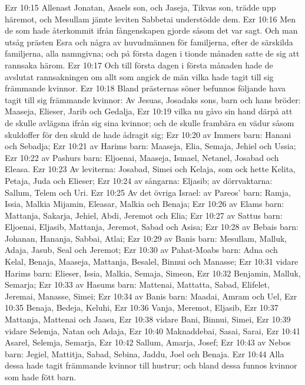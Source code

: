 Ezr 10:15  Allenast Jonatan, Asaels son, och Jaseja, Tikvas son, trädde upp häremot, och Mesullam jämte leviten Sabbetai understödde dem.
Ezr 10:16  Men de som hade återkommit ifrån fångenskapen gjorde såsom det var sagt. Och man utsåg prästen Esra och några av huvudmännen för familjerna, efter de särskilda familjerna, alla namngivna; och på första dagen i tionde månaden satte de sig att rannsaka härom.
Ezr 10:17  Och till första dagen i första månaden hade de avslutat rannsakningen om allt som angick de män vilka hade tagit till sig främmande kvinnor.
Ezr 10:18  Bland prästernas söner befunnos följande hava tagit till sig främmande kvinnor: Av Jesuas, Josadaks sons, barn och hans bröder: Maaseja, Elieser, Jarib och Gedalja,
Ezr 10:19  vilka nu gåvo sin hand därpå att de skulle avlägsna ifrån sig sina kvinnor; och de skulle frambära en vädur såsom skuldoffer för den skuld de hade ådragit sig;
Ezr 10:20  av Immers barn: Hanani och Sebadja;
Ezr 10:21  av Harims barn: Maaseja, Elia, Semaja, Jehiel och Ussia;
Ezr 10:22  av Pashurs barn: Eljoenai, Maaseja, Ismael, Netanel, Josabad och Eleasa.
Ezr 10:23  Av leviterna: Josabad, Simei och Kelaja, som ock hette Kelita, Petaja, Juda och Elieser;
Ezr 10:24  av sångarna: Eljasib; av dörrvaktarna: Sallum, Telem och Uri.
Ezr 10:25  Av det övriga Israel: av Pareos' barn: Ramja, Issia, Malkia Mijamin, Eleasar, Malkia och Benaja;
Ezr 10:26  av Elams barn: Mattanja, Sakarja, Jehiel, Abdi, Jeremot och Elia;
Ezr 10:27  av Sattus barn: Eljoenai, Eljasib, Mattanja, Jeremot, Sabad och Asisa;
Ezr 10:28  av Bebais barn: Johanan, Hananja, Sabbai, Atlai;
Ezr 10:29  av Banis barn: Mesullam, Malluk, Adaja, Jasub, Seal och Jeremot;
Ezr 10:30  av Pahat-Moabs barn: Adna och Kelal, Benaja, Maaseja, Mattanja, Besalel, Binnui och Manasse;
Ezr 10:31  vidare Harims barn: Elieser, Issia, Malkia, Semaja, Simeon,
Ezr 10:32  Benjamin, Malluk, Semarja;
Ezr 10:33  av Hasums barn: Mattenai, Mattatta, Sabad, Elifelet, Jeremai, Manasse, Simei;
Ezr 10:34  av Banis barn: Maadai, Amram och Uel,
Ezr 10:35  Benaja, Bedeja, Keluhi,
Ezr 10:36  Vanja, Meremot, Eljasib,
Ezr 10:37  Mattanja, Mattenai och Jaasu,
Ezr 10:38  vidare Bani, Binnui, Simei,
Ezr 10:39  vidare Selemja, Natan och Adaja,
Ezr 10:40  Maknaddebai, Sasai, Sarai,
Ezr 10:41  Asarel, Selemja, Semarja,
Ezr 10:42  Sallum, Amarja, Josef;
Ezr 10:43  av Nebos barn: Jegiel, Mattitja, Sabad, Sebina, Jaddu, Joel och Benaja.
Ezr 10:44  Alla dessa hade tagit främmande kvinnor till hustrur; och bland dessa funnos kvinnor som hade fött barn.


